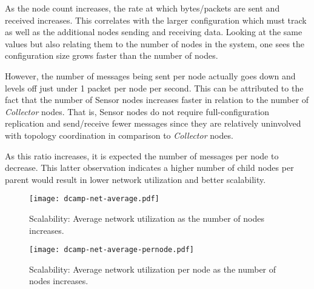 As the node count increases, the rate at which bytes/packets are sent and received increases. This correlates with the
larger configuration which \dcamp must track as well as the additional nodes sending and receiving data. Looking at the
same values but also relating them to the number of nodes in the system, one sees the configuration size grows faster
than the number of nodes.

However, the number of messages being sent per node actually goes down and levels off just under 1 packet per node per
second. This can be attributed to the fact that the number of Sensor nodes increases faster in relation to the number of
\textit{Collector} nodes. That is, Sensor nodes do not require full-configuration replication and send/receive fewer messages
since they are relatively uninvolved with topology coordination in comparison to \textit{Collector} nodes.

As this ratio increases, it is expected the number of messages per node to decrease. This latter observation indicates a
higher number of child nodes per parent would result in lower network utilization and better \dcamp scalability.

\begin{figure}[H]
    \centering
    \vspace{-20pt}
    \texttt{[image: dcamp-net-average.pdf]}
    \vspace{-40pt}
    \caption[Scalability: Average Network Utilization]
            {Scalability: Average network utilization as the number of \dcamp nodes increases.}
    \label{fig:net_avg_graph}
\end{figure}

\begin{figure}[H]
    \centering
    \vspace{-20pt}
    \texttt{[image: dcamp-net-average-pernode.pdf]}
    \vspace{-40pt}
    \caption[Scalability: Average Network Utilization Per Node]
            {Scalability: Average network utilization per node as the number of \dcamp nodes increases.}
    \label{fig:net_avg_pernode_graph}
\end{figure}
